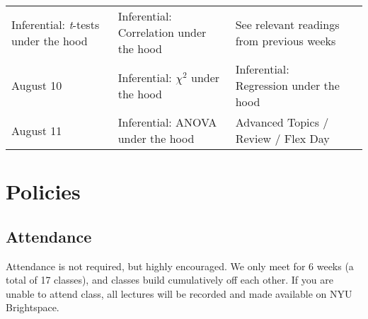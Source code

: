 \documentclass[
]{book}
\begin{document}
\begin{longtable}[]{@{}llll@{}}
\begin{minipage}[t]{0.32\columnwidth}
Inferential: \emph{t}-tests under the hood\strut
\end{minipage} & \begin{minipage}[t]{0.29\columnwidth}\raggedright
Inferential: Correlation under the hood\strut
\end{minipage} & \begin{minipage}[t]{0.18\columnwidth}\raggedright
See relevant readings from previous weeks\strut
\end{minipage}\tabularnewline
\begin{minipage}[t]{0.09\columnwidth}\raggedright
August 10\strut
\end{minipage} & \begin{minipage}[t]{0.32\columnwidth}\raggedright
Inferential: \(\chi^2\) under the hood\strut
\end{minipage} & \begin{minipage}[t]{0.29\columnwidth}\raggedright
Inferential: Regression under the hood\strut
\end{minipage} & \begin{minipage}[t]{0.18\columnwidth}\raggedright
\strut
\end{minipage}\tabularnewline
\begin{minipage}[t]{0.09\columnwidth}\raggedright
August 11\strut
\end{minipage} & \begin{minipage}[t]{0.32\columnwidth}\raggedright
Inferential: ANOVA under the hood\strut
\end{minipage} & \begin{minipage}[t]{0.29\columnwidth}\raggedright
Advanced Topics / Review / Flex Day\strut
\end{minipage} & \begin{minipage}[t]{0.18\columnwidth}\raggedright
\strut
\end{minipage}\tabularnewline
\bottomrule
\end{longtable}

\hypertarget{policies}{%
\section{Policies}\label{policies}}

\hypertarget{attendance}{%
\subsection{Attendance}\label{attendance}}

Attendance is not required, but highly encouraged. We only meet for 6 weeks (a total of 17 classes), and classes build cumulatively off each other. If you are unable to attend class, all lectures will be recorded and made available on NYU Brightspace.
\end{document}
